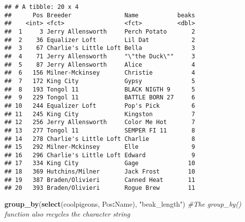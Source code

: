 \documentclass[]{article}
\newenvironment{Shaded}{\begin{snugshade}}{\end{snugshade}}
\newcommand{\KeywordTok}[1]{\textcolor[rgb]{0.13,0.29,0.53}{\textbf{#1}}}
\newcommand{\StringTok}[1]{\textcolor[rgb]{0.31,0.60,0.02}{#1}}
\newcommand{\CommentTok}[1]{\textcolor[rgb]{0.56,0.35,0.01}{\textit{#1}}}
\newcommand{\OperatorTok}[1]{\textcolor[rgb]{0.81,0.36,0.00}{\textbf{#1}}}
\newcommand{\NormalTok}[1]{#1}
\begin{document}
\begin{verbatim}
## # A tibble: 20 x 4
##      Pos Breeder               Name           beaks
##    <int> <fct>                 <fct>          <dbl>
##  1     3 Jerry Allensworth     Perch Potato       2
##  2    36 Equalizer Loft        Lil Dat            2
##  3    67 Charlie's Little Loft Bella              3
##  4    71 Jerry Allensworth     "\"the Duck\""     3
##  5    87 Jerry Allensworth     Alice              4
##  6   156 Milner-Mckinsey       Christie           4
##  7   172 King City             Gypsy              5
##  8   193 Tongol 11             BLACK NIGTH 9      5
##  9   229 Tongol 11             BATTLE BORN 27     6
## 10   244 Equalizer Loft        Pop's Pick         6
## 11   245 King City             Kingston           7
## 12   256 Jerry Allensworth     Color Me Hot       7
## 13   277 Tongol 11             SEMPER FI 11       8
## 14   278 Charlie's Little Loft Charlie            8
## 15   292 Milner-Mckinsey       Elle               9
## 16   296 Charlie's Little Loft Edward             9
## 17   334 King City             Gage              10
## 18   369 Hutchins/Milner       Jack Frost        10
## 19   387 Braden/Olivieri       Canned Heat       11
## 20   393 Braden/Olivieri       Rogue Brew        11
\end{verbatim}

\begin{Shaded}
\begin{Highlighting}[]
\KeywordTok{group_by}\NormalTok{(}\KeywordTok{select}\NormalTok{(coolpigeons, Pos}\OperatorTok{:}\NormalTok{Name), }\StringTok{"beak_length"}\NormalTok{) }\CommentTok{#The group_by() function also recycles the character string }
\end{Highlighting}
\end{Shaded}
\end{document}
